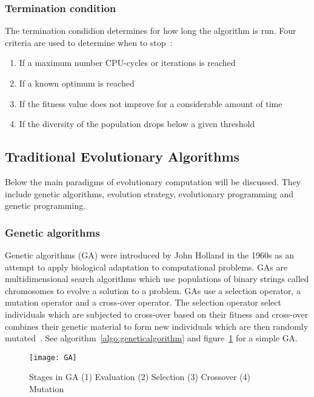 \subsubsection{Termination condition}

The termination condidion determines for how long the algorithm is run. Four criteria are used to determine when to stop~\cite{Eiben2015_whatevolutionary}:

\begin{enumerate}
  \item If a maximum number CPU-cycles or iterations is reached
  \item If a known optimum is reached
  \item If the fitness value does not improve for a considerable amount of time
  \item If the diversity of the population drops below a given threshold
\end{enumerate}

\subsection{Traditional Evolutionary Algorithms}

Below the main paradigms of evolutionary computation will be discussed. They include genetic algorithms, evolution strategy, evolutionary programming and genetic programming.

\subsubsection{Genetic algorithms}

Genetic algorithms (GA) were introduced by John Holland in the 1960s as an attempt to apply biological adaptation to computational problems. GAs are multidimensional search algorithms which use populations of binary strings called chromosomes to evolve a solution to a problem. GAs use a selection operator, a mutation operator and a cross-over operator. The selection operator select individuals which are subjected to cross-over based on their fitness and cross-over combines their genetic material to form new individuals which are then randomly mutated~\cite{mitchel1999evolutionary}. See algorithm~\ref{algo:geneticalgorithm} and figure~\ref{fig:GA} for a simple GA.

\begin{figure}[H]
  \centering
  \texttt{[image: GA]}
  \caption{Stages in GA (1) Evaluation (2) Selection (3) Crossover (4) Mutation}
  \label{fig:GA}
\end{figure}

